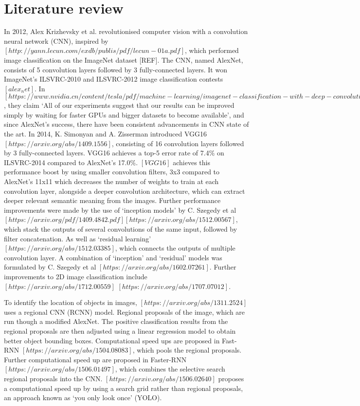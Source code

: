 \documentclass[11pt]{article}
\begin{document}
\section{Literature review}
In 2012, Alex Krizhevsky et al. revolutionised computer vision with a convolution neural network (CNN), inspired by $[http://yann.lecun.com/exdb/publis/pdf/lecun-01a.pdf]$, which performed image classification on the ImageNet dataset [REF]. The CNN, named AlexNet, consists of 5 convolution layers followed by 3 fully-connected layers. It won ImageNet's ILSVRC-2010 and ILSVRC-2012 image classification contests $[alex_net]$. In $[https://www.nvidia.cn/content/tesla/pdf/machine-learning/imagenet-classification-with-deep-convolutional-nn.pdf]$, they claim `All of our experiments suggest that our results can be improved simply by waiting for faster GPUs and bigger datasets to become available', and since AlexNet's success, there have been consistent advancements in CNN state of the art. In 2014, K. Simonyan and A. Zisserman introduced VGG16$[https://arxiv.org/abs/1409.1556]$, consisting of 16 convolution layers followed by 3 fully-connected layers. VGG16 achieves a top-5 error rate of 7.4\% on ILSVRC-2014 compared to AlexNet's 17.0\%. $[VGG16]$ achieves this performance boost by using smaller convolution filters, 3x3 compared to AlexNet's 11x11 which decreases the number of weights to train at each convolution layer, alongside a deeper convolution architecture, which can extract deeper relevant semantic meaning from the images. Further performance improvements were made by the use of `inception models' by C. Szegedy et al $[https://arxiv.org/pdf/1409.4842.pdf]$$[https://arxiv.org/abs/1512.00567]$, which stack the outputs of several convolutions of the same input, followed by filter concatenation. As well as `residual learning'$[https://arxiv.org/abs/1512.03385]$, which connects the outputs of multiple convolution layer. A combination of `inception' and `residual' models was formulated by C. Szegedy et al $[https://arxiv.org/abs/1602.07261]$. Further improvements to 2D image classification include $[https://arxiv.org/abs/1712.00559]$ $[https://arxiv.org/abs/1707.07012]$.

To identify the location of objects in images, $[https://arxiv.org/abs/1311.2524]$ uses a regional CNN (RCNN) model. Regional proposals of the image, which are run though a modified AlexNet. The positive classification results from the regional proposals are then adjusted using a linear regression model to obtain better object bounding boxes. Computational speed ups are proposed in Fast-RNN $[https://arxiv.org/abs/1504.08083]$, which pools the regional proposals. Further computational speed up are proposed in Faster-RNN $[https://arxiv.org/abs/1506.01497]$, which combines the selective search regional proposals into the CNN. $[https://arxiv.org/abs/1506.02640]$ proposes a computational speed up by using a search grid rather than regional proposals, an approach known as `you only look once' (YOLO).
\end{document}
